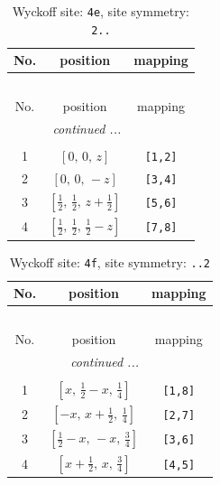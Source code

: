 \documentclass[fleqn,8pt]{jsarticle}
\begin{document}
\begin{longtable}{ccc}
\caption{Wyckoff site: {\tt 4e}, site symmetry: {\tt 2..}}
 \\
 \hline \hline
No. & position & mapping \\ \hline \endfirsthead

\multicolumn{2}{l}{\tablename\ \thetable{}} \\
 \hline \hline
No. & position & mapping \\ \hline \endhead

 \hline \hline
\multicolumn{2}{r}{\footnotesize\it continued ...} \\ \endfoot

 \hline \hline
\multicolumn{2}{r}{} \\ \endlastfoot

1 & $\left[ 0,\, 0,\, z \right]$ & {\tt [1,2]} \\ \hline
2 & $\left[ 0,\, 0,\, - z \right]$ & {\tt [3,4]} \\ \hline
3 & $\left[ \frac{1}{2},\, \frac{1}{2},\, z + \frac{1}{2} \right]$ & {\tt [5,6]} \\ \hline
4 & $\left[ \frac{1}{2},\, \frac{1}{2},\, \frac{1}{2} - z \right]$ & {\tt [7,8]} \\
\end{longtable}
\renewcommand{\arraystretch}{1.2}
\begin{longtable}{ccc}
\caption{Wyckoff site: {\tt 4f}, site symmetry: {\tt ..2}}
 \\
 \hline \hline
No. & position & mapping \\ \hline \endfirsthead

\multicolumn{2}{l}{\tablename\ \thetable{}} \\
 \hline \hline
No. & position & mapping \\ \hline \endhead

 \hline \hline
\multicolumn{2}{r}{\footnotesize\it continued ...} \\ \endfoot

 \hline \hline
\multicolumn{2}{r}{} \\ \endlastfoot

1 & $\left[ x,\, \frac{1}{2} - x,\, \frac{1}{4} \right]$ & {\tt [1,8]} \\ \hline
2 & $\left[ - x,\, x + \frac{1}{2},\, \frac{1}{4} \right]$ & {\tt [2,7]} \\ \hline
3 & $\left[ \frac{1}{2} - x,\, - x,\, \frac{3}{4} \right]$ & {\tt [3,6]} \\ \hline
4 & $\left[ x + \frac{1}{2},\, x,\, \frac{3}{4} \right]$ & {\tt [4,5]} \\
\end{longtable}
\end{document}

